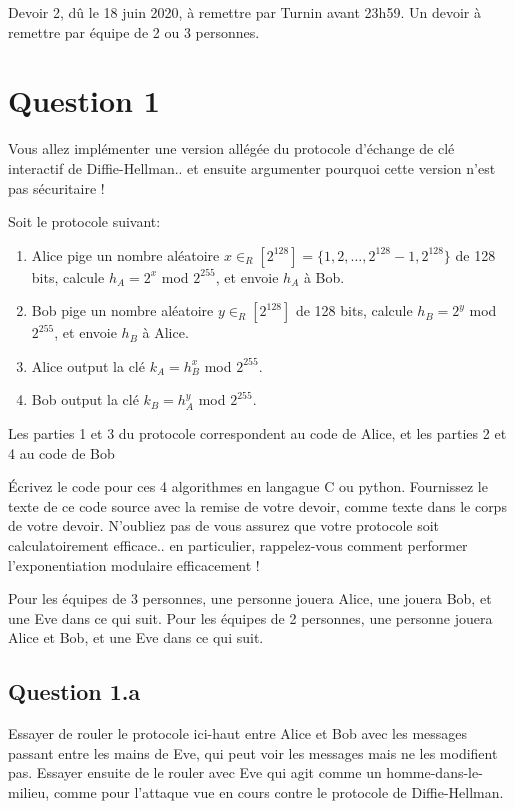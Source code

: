 \documentclass[12pt]{article}
\begin{document}
Devoir 2, dû le 18 juin 2020, à remettre par Turnin avant 23h59. Un devoir à remettre par équipe de 2 ou 3 personnes.



\section{Question 1}

Vous allez implémenter une version allégée du protocole d'échange de clé interactif de Diffie-Hellman.. et ensuite argumenter pourquoi cette version n'est pas sécuritaire !

Soit le protocole suivant:

\begin{enumerate}
	\item Alice pige un nombre aléatoire $x \in_R [2^{128}] = \{1, 2, \ldots, 2^{128} - 1, 2^{128} \}$ de 128 bits, calcule $h_A = 2^x$ mod $2^{255}$, et envoie $h_A$ à Bob.
	\item Bob pige un nombre aléatoire $y \in_R [2^{128}]$ de 128 bits, calcule $h_B = 2^y$ mod $2^{255}$, et envoie $h_B$ à Alice.
	\item Alice output la clé $k_A = h_B^x$ mod $2^{255}$. 
	\item Bob output la clé $k_B = h_A^y$ mod $2^{255}$.
\end{enumerate}

Les parties 1 et 3 du protocole correspondent au code de Alice, et les parties 2 et 4 au code de Bob

Écrivez le code pour ces 4 algorithmes en langague C ou python. Fournissez le texte de ce code source avec la remise de votre devoir, comme texte dans le corps de votre devoir. N'oubliez pas de vous assurez que votre protocole soit calculatoirement efficace.. en particulier, rappelez-vous comment performer l'exponentiation modulaire efficacement !

Pour les équipes de 3 personnes, une personne jouera Alice, une jouera Bob, et une Eve dans ce qui suit. Pour les équipes de 2 personnes, une personne jouera Alice et Bob, et une Eve dans ce qui suit. 



\subsection{Question 1.a}

Essayer de rouler le protocole ici-haut entre Alice et Bob avec les messages passant entre les mains de Eve, qui peut voir les messages mais ne les modifient pas. Essayer ensuite de le rouler avec Eve qui agit comme un homme-dans-le-milieu, comme pour l'attaque vue en cours contre le protocole de Diffie-Hellman.
\end{document}
